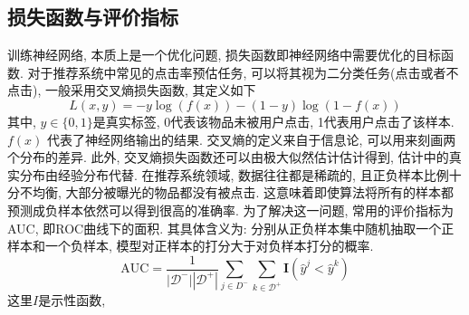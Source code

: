 \subsection{损失函数与评价指标}
训练神经网络, 本质上是一个优化问题, 损失函数即神经网络中需要优化的目标函数. 对于推荐系统中常见的点击率预估任务, 可以将其视为二分类任务(点击或者不点击), 一般采用交叉熵损失函数, 其定义如下
\begin{equation}
	L(x,y)=-y \log (f(x))-(1-y) \log (1-f(x))
\end{equation}
其中, $y \in \{ 0,1\}$是真实标签, 0代表该物品未被用户点击, 1代表用户点击了该样本. $f(x)$ 代表了神经网络输出的结果. 交叉熵的定义来自于信息论, 可以用来刻画两个分布的差异. 此外, 交叉熵损失函数还可以由极大似然估计估计得到, 估计中的真实分布由经验分布代替.
在推荐系统领域, 数据往往都是稀疏的, 且正负样本比例十分不均衡, 大部分被曝光的物品都没有被点击. 这意味着即使算法将所有的样本都预测成负样本依然可以得到很高的准确率. 为了解决这一问题, 常用的评价指标为AUC, 即ROC曲线下的面积. 其具体含义为: 分别从正负样本集中随机抽取一个正样本和一个负样本, 模型对正样本的打分大于对负样本打分的概率.
\begin{equation}
	\mathrm{AUC}=\frac{1}{\left|\mathcal{D}^{-}\right|\left|\mathcal{D}^{+}\right|} \sum_{j \in D^{-}} \sum_{k \in \mathcal{D}^{+}} \mathbf{I}\left(\hat{y}^{j}<\hat{y}^{k}\right)
\end{equation}
这里$I$是示性函数, 

























